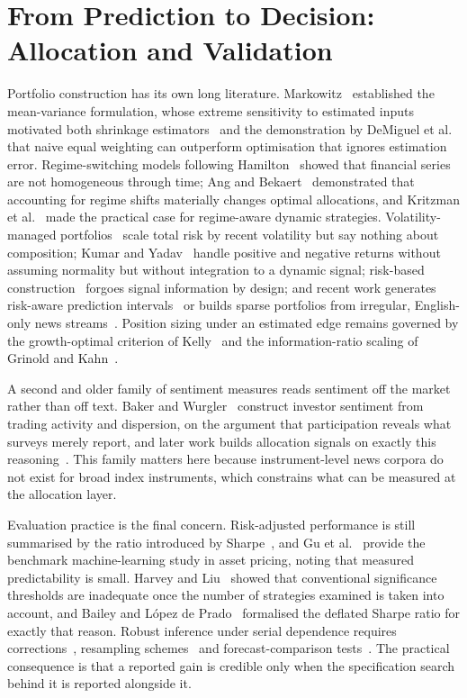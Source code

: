 \section{From Prediction to Decision: Allocation and Validation}

Portfolio construction has its own long literature. Markowitz~\cite{markowitz1952} established
the mean-variance formulation, whose extreme sensitivity to estimated inputs motivated both
shrinkage estimators~\cite{ledoit2004} and the demonstration by DeMiguel et
al.~\cite{demiguel2009} that naive equal weighting can outperform optimisation that ignores
estimation error. Regime-switching models following Hamilton~\cite{hamilton1989} showed that
financial series are not homogeneous through time; Ang and Bekaert~\cite{ang2002} demonstrated
that accounting for regime shifts materially changes optimal allocations, and Kritzman et
al.~\cite{kritzman2012} made the practical case for regime-aware dynamic strategies.
Volatility-managed portfolios~\cite{moreira2017} scale total risk by recent volatility but say
nothing about composition; Kumar and Yadav~\cite{kumar2024rdmdea} handle positive and negative
returns without assuming normality but without integration to a dynamic signal; risk-based
construction~\cite{lopezdeprado2016} forgoes signal information by design; and recent work
generates risk-aware prediction intervals~\cite{gu2025ragic} or builds sparse portfolios from
irregular, English-only news streams~\cite{zhu2025spin}. Position sizing under an estimated
edge remains governed by the growth-optimal criterion of Kelly~\cite{kelly1956} and the
information-ratio scaling of Grinold and Kahn~\cite{grinold2000}.

A second and older family of sentiment measures reads sentiment off the market rather than off
text. Baker and Wurgler~\cite{bakerwurgler2007} construct investor sentiment from trading
activity and dispersion, on the argument that participation reveals what surveys merely report,
and later work builds allocation signals on exactly this
reasoning~\cite{singsiri2026,naidoo2025}. This family matters here because instrument-level news
corpora do not exist for broad index instruments, which constrains what can be measured at the
allocation layer.

Evaluation practice is the final concern. Risk-adjusted performance is still summarised by the
ratio introduced by Sharpe~\cite{sharpe1966}, and Gu et al.~\cite{gu2020} provide the
benchmark machine-learning study in asset pricing, noting that measured predictability is
small. Harvey and Liu~\cite{harvey2015} showed that conventional significance thresholds are
inadequate once the number of strategies examined is taken into account, and Bailey and
L\'opez de Prado~\cite{bailey2014dsr} formalised the deflated Sharpe ratio for exactly that
reason. Robust inference under serial dependence requires corrections~\cite{newey1987},
resampling schemes~\cite{politis1994} and forecast-comparison tests~\cite{diebold1995}. The
practical consequence is that a reported gain is credible only when the specification search
behind it is reported alongside it.

